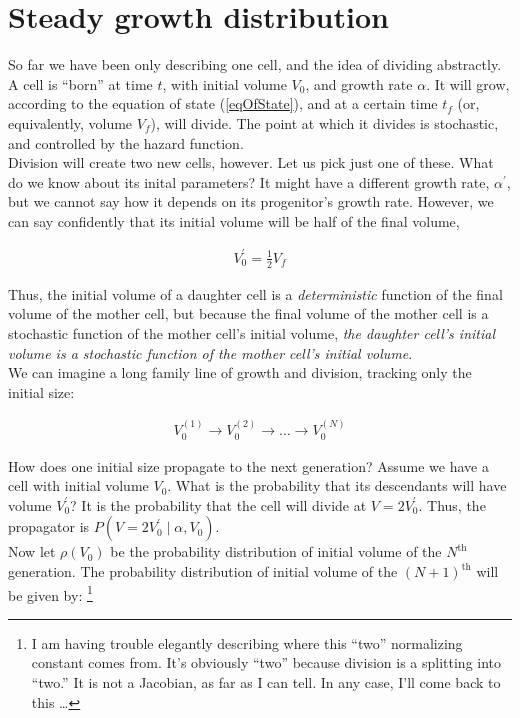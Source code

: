\documentclass{article}
\begin{document}
\section{Steady growth distribution}

So far we have been only describing one cell, and the idea of dividing abstractly.\\

A cell is ``born'' at time $t$, with initial volume $V_0$, and growth rate $\alpha$. It will grow, according to the equation of state (\ref{eqOfState}), and at a certain time $t_f$ (or, equivalently, volume $V_f$), will divide. The point at which it divides is stochastic, and controlled by the hazard function.\\

Division will create two new cells, however. Let us pick just one of these. What do we know about its inital parameters? It might have a different growth rate, $\alpha^\prime$, but we cannot say how it depends on its progenitor's growth rate. However, we can say confidently that its initial volume will be half of the final volume,

\begin{align}
V_0^\prime = \frac{1}{2}V_f
\end{align}

Thus, the initial volume of a daughter cell is a \emph{deterministic} function of the final volume of the mother cell, but because the final volume of the mother cell is a stochastic function of the mother cell's initial volume, \emph{the daughter cell's initial volume is a stochastic function of the mother cell's initial volume}.\\

We can imagine a long family line of growth and division, tracking only the initial size:

\begin{align}
V_0^{(1)} \to V_0^{(2)} \to \dots \to V_0^{(N)}
\end{align}

How does one initial size propagate to the next generation? Assume we have a cell with initial volume $V_0$. What is the probability that its descendants will have volume $V_0^\prime$? It is the probability that the cell will divide at $V = 2 V_0^\prime$. Thus, the propagator is $P(V = 2 V_0^\prime \mid \alpha, V_0)$.\\

Now let $\rho(V_0)$ be the probability distribution of initial volume of the $N^\text{th}$ generation. The probability distribution of initial volume of the $(N+1)^\text{th}$ will be given by: \footnote{I am having trouble elegantly describing where this ``two'' normalizing constant comes from. It's obviously ``two'' because division is a splitting into ``two.'' It is not a Jacobian, as far as I can tell. In any case, I'll come back to this \dots }
\end{document}
